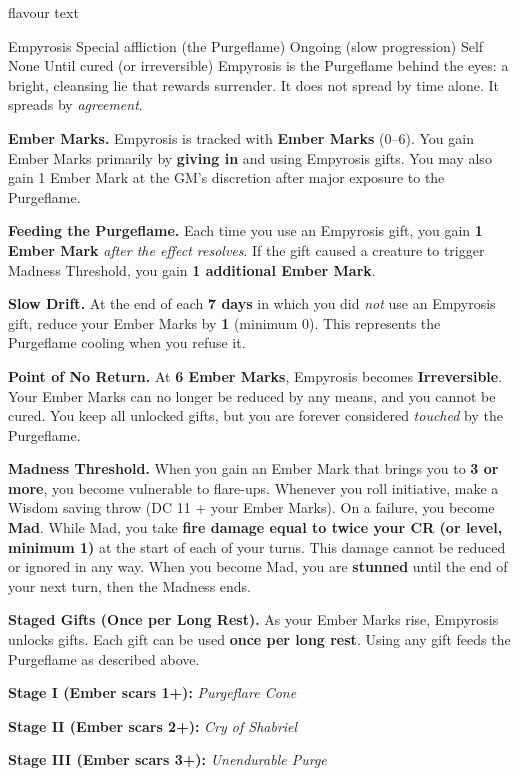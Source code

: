 flavour text

\DndSpellHeader%
  {Empyrosis}
  {Special affliction (the Purgeflame)}
  {Ongoing (slow progression)}
  {Self}
  {None}
  {Until cured (or irreversible)}
Empyrosis is the Purgeflame behind the eyes: a bright, cleansing lie that rewards surrender. It does not spread by time alone. It spreads by \emph{agreement}.

\textbf{Ember Marks.} Empyrosis is tracked with \textbf{Ember Marks} (0--6). You gain Ember Marks primarily by \textbf{giving in} and using Empyrosis gifts. You may also gain 1 Ember Mark at the GM's discretion after major exposure to the Purgeflame.

\textbf{Feeding the Purgeflame.} Each time you use an Empyrosis gift, you gain \textbf{1 Ember Mark} \emph{after the effect resolves}. If the gift caused a creature to trigger Madness Threshold, you gain \textbf{1 additional Ember Mark}.

\textbf{Slow Drift.} At the end of each \textbf{7 days} in which you did \emph{not} use an Empyrosis gift, reduce your Ember Marks by \textbf{1} (minimum 0). This represents the Purgeflame cooling when you refuse it.

\textbf{Point of No Return.} At \textbf{6 Ember Marks}, Empyrosis becomes \textbf{Irreversible}. Your Ember Marks can no longer be reduced by any means, and you cannot be cured. You keep all unlocked gifts, but you are forever considered \emph{touched} by the Purgeflame.

\textbf{Madness Threshold.} When you gain an Ember Mark that brings you to \textbf{3 or more}, you become vulnerable to flare-ups. Whenever you roll initiative, make a Wisdom saving throw (DC 11 + your Ember Marks). On a failure, you become \textbf{Mad}. While Mad, you take \textbf{fire damage equal to twice your CR (or level, minimum 1)} at the start of each of your turns. This damage cannot be reduced or ignored in any way. When you become Mad, you are \textbf{stunned} until the end of your next turn, then the Madness ends.

\textbf{Staged Gifts (Once per Long Rest).} As your Ember Marks rise, Empyrosis unlocks gifts. Each gift can be used \textbf{once per long rest}. Using any gift feeds the Purgeflame as described above.

\textbf{Stage I (Ember scars 1+):} \emph{Purgeflare Cone}

\textbf{Stage II (Ember scars 2+):} \emph{Cry of Shabriel}

\textbf{Stage III (Ember scars 3+):} \emph{Unendurable Purge}

